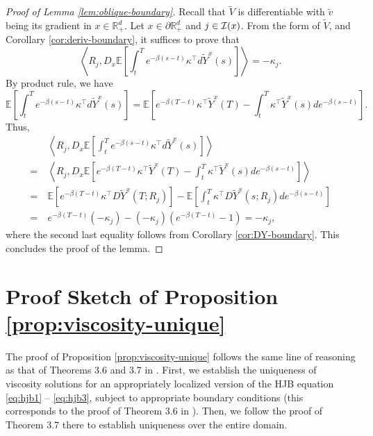 \documentclass[11pt]{article}
\theoremstyle{definition}
\theoremstyle{plain}
\newcommand{\R}{\mathbb{R}}
\newcommand{\E}{\mathbb{E}}
\newcommand{\cI}{{\cal I}}
\begin{document}
\begin{appendices}
\begin{proof}[Proof of Lemma \ref{lem:oblique-boundary}]
Recall that $\tilde V$ is differentiable with $\tilde v$ being its gradient in $x \in \R_+^d$. 
Let $x\in \partial \R_+^d$ and $j \in \cI(x)$. 
From the form of $\tilde V$, and Corollary \ref{cor:deriv-boundary}, it suffices to prove that 
\begin{equation*}
\left\langle R_j, D_x \E\left[\int_t^T e^{-\beta(s-t)} \kappa^{\top} d\tilde Y^x (s)\right] \right\rangle = -\kappa_j.
\end{equation*}
By product rule, we have 
\[
\E\left[\int_t^T e^{-\beta(s-t)} \kappa^{\top} d\tilde Y^x (s)\right] = \E\left[e^{-\beta(T-t)} \kappa^{\top} \tilde Y^x (T) - \int_t^T \kappa^{\top} \tilde Y^x(s) de^{-\beta(s-t)}\right].
\]
Thus, 
\begin{align*}
&~\left\langle R_j, D_x \E\left[\int_t^T e^{-\beta(s-t)} \kappa^{\top} d\tilde Y^x (s)\right] \right\rangle \\
=&~\left\langle R_j, D_x \E\left[e^{-\beta(T-t)} \kappa^{\top} \tilde Y^x (T) - \int_t^T \kappa^{\top} \tilde Y^x(s) de^{-\beta(s-t)}\right] \right\rangle \\
=&~\E\left[e^{-\beta(T-t)} \kappa^{\top} D\tilde Y^x (T; R_j)\right] - \E\left[\int_t^T \kappa^{\top} D\tilde Y^x(s; R_j) de^{-\beta(s-t)}\right] \\
=&~ e^{-\beta(T-t)}(-\kappa_j) - (-\kappa_j) \left(e^{-\beta(T-t)} - 1\right) = -\kappa_j, 
\end{align*}
where the second last equality follows from Corollary \ref{cor:DY-boundary}. 
This concludes the proof of the lemma.
\end{proof}

\section{Proof Sketch of Proposition \ref{prop:viscosity-unique}}\label{app:viscosity-unique}
The proof of Proposition \ref{prop:viscosity-unique} follows 
the same line of reasoning as that of Theorems 3.6 and 3.7 in \cite{borkar2004ergodic}. 
First, we establish the uniqueness of viscosity solutions for 
an appropriately localized version of the HJB equation \eqref{eq:hjb1} -- \eqref{eq:hjb3}, 
subject to appropriate boundary conditions (this corresponds to the proof of Theorem 3.6 in \cite{borkar2004ergodic}). 
Then, we follow the proof of Theorem 3.7 there to 
establish uniqueness over the entire domain. 


\end{appendices}
\end{document}
